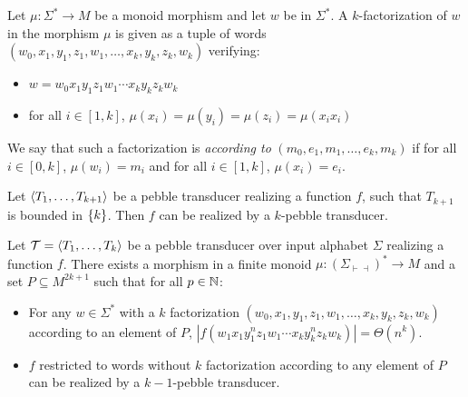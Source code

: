 
\begin{definition}
    Let $\mu:\Sigma^*\rightarrow M$ be a monoid morphism and let $w$ be in $ \Sigma^*$.
    A $k$-factorization of $w$ in the morphism $\mu$ is given as a tuple of words $(w_0,x_{1},y_1,z_1,w_1,\ldots,x_k,y_k,z_k, w_k)$ verifying:
    \begin{itemize}   
        \item  $w=w_0x_1y_1z_1w_1\cdots x_ky_kz_kw_k$
        \item for all $i\in [1,k]$, $\mu(x_i)=\mu(y_i)=\mu(z_i)=\mu(x_ix_i)$
    \end{itemize}
    We say that such a factorization is \emph{according to} $(m_0,e_1,m_1,\ldots,e_k,m_k)$ if for all $i\in [0,k]$, $\mu(w_i)=m_i$ and for all $i\in [1,k]$, $\mu(x_{i})=e_i$.
\end {definition}




\begin{comment}
\begin{lemma}
Let $\Tt=\tuple{T_k,\ldots,T_1}$ be a $k$-pebble transducer over input alphabet $\Sigma$.
One can obtain a new $k$-pebble transducer $\Tt'=\tuple{T_k',\ldots,T_1'}$ over $\Sigma'=\Sigma\times L $ such that:
\begin{itemize}
\item for any $w\in \Sigma'^*$, $\Tt'(w)=\Tt\circ\pi_{\Sigma}(w)$
\item For any $\bigcup_{j<k} Q_j'$-producing triple $(w_1,w_2,w_3)$, we have $\Tt'(w_1w_2^kw_3)=\Theta(|w_2|^k)$
\end{itemize}

\end{lemma}
\end{comment}

\begin{lemma} 
    \label{lem:bounded}
    Let $\langle T_1,\ldots,T_{k+1} \rangle$ be a pebble transducer realizing a function $f$, such that $T_{k+1}$ is bounded in $\{k\}$. Then $f$ can be realized by a $k$-pebble transducer.
\end{lemma}     

\begin{lemma}\label{lem:name}
    Let ${\mathcal T}=\langle T_1,\ldots,T_k \rangle$ be a pebble transducer over input alphabet $\Sigma$ realizing a function $f$.
    There exists a morphism in a finite monoid $\mu:(\Sigma_{\vdash\dashv})^*\rightarrow M$ and a set $P\subseteq M^{2k+1}$ such that for all $p\in \mathbb{N}$:
    \begin{itemize}
    \item For any $w\in \Sigma^*$ with a $k$ factorization 
    $(w_0,x_{1},y_1,z_1,w_1,\ldots,x_k,y_k,z_k, w_k)$ according to an element of $P$, $|f(w_1x_1y_{1}^nz_1w_1\cdots x_ky_k^nz_kw_k)|=\Theta(n^k)$.
    \item $f$ restricted to words without $k$ factorization according to any element of $P$ can be realized by a $k{-}1$-pebble transducer.
    \end{itemize}
    
\end{lemma}




